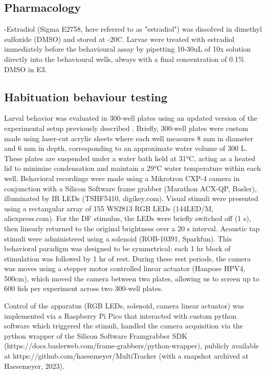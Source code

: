 \documentclass[9pt,lineno]{RandlettLab_elife}
\begin{document}
\subsection{Pharmacology}

\textbeta-Estradiol (Sigma E2758, here referred to as "estradiol") was dissolved in dimethyl sulfoxide (DMSO) and stored at -20\degree C. 
Larvae were treated with estradiol immediately before the behavioural assay by pipetting 10-30uL of 10x solution directly into the behavioural wells, always with a final concentration of 0.1\% DMSO in E3.

\subsection{Habituation behaviour testing}

Larval behavior was evaluated in 300-well plates using an updated version of the experimental setup previously described \citep{Randlett2019-fj,Lamire2023-he}. 
Briefly, 300-well plates were custom made using laser-cut acrylic sheets where each well measures 8 mm in diameter and 6 mm in depth, corresponding to an approximate water volume of 300 \textmu L.
These plates are suspended under a water bath held at 31°C, acting as a heated lid to minimize condensation and maintain a 29°C water temperature within each well. 
Behavioral recordings were made using a Mikrotron CXP-4 camera in conjunction with a Silicon Software frame grabber (Marathon ACX-QP, Basler), illuminated by IR LEDs (TSHF5410, digikey.com). Visual stimuli were presented using a rectangular array of 155 WS2813 RGB LEDs (144LED/M, aliexpress.com). 
For the DF stimulus, the LEDs were briefly switched off (1 s), then linearly returned to the original brightness over a 20 s interval. 
Acoustic tap stimuli were administered using a solenoid (ROB-10391, Sparkfun). 
This behavioral paradigm was designed to be symmetrical: each 1 hr block of stimulation was followed by 1 hr of rest. 
During these rest periods, the camera was moves using a stepper motor controlled linear actuator (Hanpose HPV4, 500cm), which moved the camera between two plates, allowing us to screen up to 600 fish per experiment across two 300-well plates. 

Control of the apparatus (RGB LEDs, solenoid, camera linear actuator) was implemented via a Raspberry Pi Pico that interacted with custom python software which triggered the stimuli, handled the camera acquisition via the python wrapper of the Silicon Software Framgrabber SDK (https://docs.baslerweb.com/frame-grabbers/python-wrapper), publicly available at https://github.com/haesemeyer/MultiTracker (with a snapshot archived at Haesemeyer, 2023).
\end{document}
